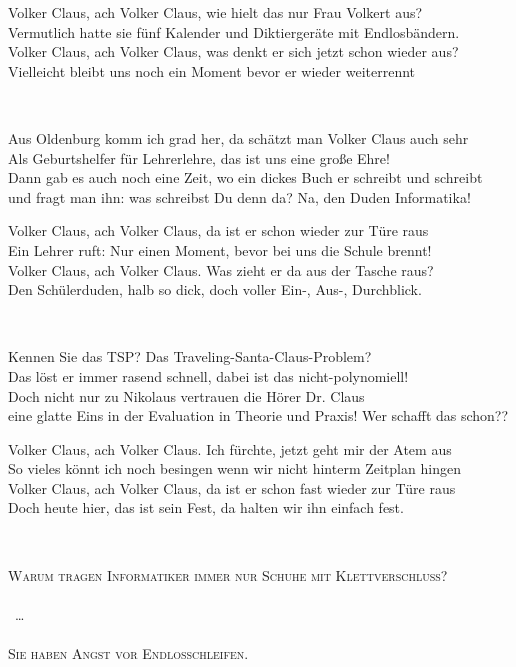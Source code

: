 \documentclass[11pt,a5paper]{article}
\newcommand\refrain[1]{\begin{tcolorbox}#1\end{tcolorbox} \ }
\begin{document}
\refrain{
Volker Claus, ach Volker Claus, wie hielt das nur Frau Volkert aus? \\
Vermutlich hatte sie fünf Kalender und Diktiergeräte mit Endlosbändern. \\
Volker Claus, ach Volker Claus, was denkt er sich jetzt schon wieder aus? \\
Vielleicht bleibt uns noch ein Moment bevor er wieder weiterrennt}

Aus Oldenburg komm ich grad her, da schätzt man Volker Claus auch sehr \\
Als Geburtshelfer für Lehrerlehre, das ist uns eine große Ehre! \\
Dann gab es auch noch eine Zeit, wo ein dickes Buch er schreibt und schreibt \\
und fragt man ihn: was schreibst Du denn da? \glqq Na, den Duden Informatika!\grqq \\

\refrain{Volker Claus, ach Volker Claus, da ist er schon wieder zur Türe raus \\
Ein Lehrer ruft: \glqq Nur einen Moment, bevor bei uns die Schule brennt!\grqq \\
Volker Claus, ach Volker Claus. Was zieht er da aus der Tasche raus? \\
Den Schülerduden, halb so dick, doch voller Ein-, Aus-, Durchblick.}

Kennen Sie das TSP? Das Traveling-Santa-Claus-Problem? \\
Das löst er immer rasend schnell, dabei ist das nicht-polynomiell! \\
Doch nicht nur zu Nikolaus vertrauen die Hörer Dr. Claus \\
eine glatte Eins in der Evaluation in Theorie und Praxis! Wer schafft das schon?? \\

\refrain{Volker Claus, ach Volker Claus. Ich fürchte, jetzt geht mir der Atem aus \\
So vieles könnt ich noch besingen wenn wir nicht hinterm Zeitplan hingen \\
Volker Claus, ach Volker Claus, da ist er schon fast wieder zur Türe raus \\
Doch heute hier, das ist sein Fest, da halten wir ihn einfach fest.}

\vspace*{4cm}

\begin{center}
	\textsc{
		Warum tragen Informatiker immer nur Schuhe mit Klettverschluss? \\
		\ \\
		\ \ldots \\
		\ \\
		Sie haben Angst vor Endlosschleifen.}
\end{center}
\end{document}
